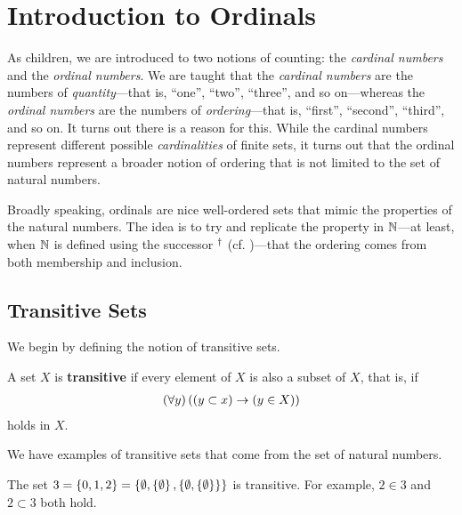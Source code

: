 \section{Introduction to Ordinals}

As children, we are introduced to two notions of counting: the \textit{cardinal numbers} and the \textit{ordinal numbers}. We are taught that the \textit{cardinal numbers} are the numbers of \textit{quantity}---that is, ``one'', ``two'', ``three'', and so on---whereas the \textit{ordinal numbers} are the numbers of \textit{ordering}---that is, ``first'', ``second'', ``third'', and so on. It turns out there is a reason for this. While the cardinal numbers represent different possible \textit{cardinalities} of finite sets, it turns out that the ordinal numbers represent a broader notion of ordering that is not limited to the set of natural numbers.

Broadly speaking, ordinals are nice well-ordered sets that mimic the properties of the natural numbers. The idea is to try and replicate the property in $\mathbb{N}$---at least, when $\mathbb{N}$ is defined using the successor $^{\dagger}$ (cf. )---that the ordering comes from both membership and inclusion.

\subsection{Transitive Sets}

We begin by defining the notion of transitive sets.

\begin{boxdefinition}[Transitivity]
    A set $X$ is \textbf{transitive} if every element of $X$ is also a subset of $X$, that is, if
    \begin{align*}
        \left( \forall y \right)\left( \left( y \subset x \right) \to \left( y \in X \right) \right)
    \end{align*}
    holds in $X$.
\end{boxdefinition}

We have examples of transitive sets that come from the set of natural numbers.

\begin{boxexample}\label{Ch3:Eg:3_trans}
    The set $3 = \left\{ 0, 1, 2 \right\} = \left\{ \emptyset, \left\{ \emptyset \right\}, \left\{ \emptyset, \left\{ \emptyset \right\} \right\} \right\}$ is transitive. For example, $2 \in 3$ and $2 \subset 3$ both hold.
\end{boxexample}


